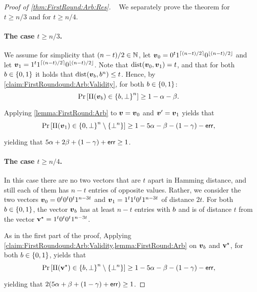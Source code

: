 \begin{proof}[Proof of \cref{thm:FirstRound:Arb:Res}]~
We separately prove the theorem for $t \ge n/3$ and for $t \ge n/4$.

\paragraph{The case $t \ge n/3$.}
We assume for simplicity that $(n-t)/2\in {\mathbb{N}}$, let ${ \boldsymbol{v}}_0= 0^t 1^{\left\lceil (n-t)/2 \right\rceil} 0^{\left \lfloor(n-t)/2 \right \rfloor} $ and let ${ \boldsymbol{v}}_1 = 1^t 1^{\left\lceil (n-t)/2 \right\rceil} 0^{\left \lfloor(n-t)/2 \right \rfloor}$. Note that $\mathrm{dist}({ \boldsymbol{v}}_0,{ \boldsymbol{v}}_1) = t$, and that for both $b\in \{0,1\}$ it holds that $\mathrm{dist}({ \boldsymbol{v}}_b,b^n)\le t$. Hence, by \cref{claim:FirstRoundound:Arb:Validity}, for both $b\in \{0,1\}$:
\begin{align*}
\Pr_{}\left[\Pi({ \boldsymbol{v}}_b) \in \left\{b,\bot\right\}^n\right] \ge 1 - \alpha - \beta.
\end{align*}
Applying \cref{lemma:FirstRound:Arb} to ${ \boldsymbol{v}}= { \boldsymbol{v}}_0$ and ${ \boldsymbol{v}}'= { \boldsymbol{v}}_1$ yields that
\begin{align*}
\Pr_{}\left[\Pi({ \boldsymbol{v}}_1) \in \left\{0,\perp\right\}^n \setminus \left\{\bot^n\right\}\right] \ge 1 - 5\alpha - \beta - (1- \gamma) - \mathsf{err},
\end{align*}
yielding that $5\alpha + 2\beta + (1-\gamma) + \mathsf{err}\ge 1$.

\paragraph{The case $t \ge n/4$.} In this case there are no two vectors that are $t$ apart in Hamming distance, and still each of them has $n-t$ entries of opposite values. Rather, we consider the two vectors ${ \boldsymbol{v}}_0= 0^t 0^t 0^t 1^{n-3t}$ and ${ \boldsymbol{v}}_1= 1^t 1^t 0^t 1^{n-3t}$ of distance $2t$. For both $b\in \{0,1\}$, the vector ${ \boldsymbol{v}}_b$ has at least $n-t$ entries with $b$ and is of distance $t$ from the vector $\mathbf{v}^{\star} =1^t 0^t 0^t 1^{n-3t}$.

As in the first part of the proof, Applying \cref{claim:FirstRoundound:Arb:Validity,lemma:FirstRound:Arb} on ${ \boldsymbol{v}}_b$ and $\mathbf{v}^{\star}$, for both $b\in \{0,1\}$, yields that
\begin{align*}
\Pr_{}\left[\Pi(\mathbf{v}^{\star}) \in \left\{b,\bot\right\}^n \setminus \left\{\bot^n\right\}\right] \ge 1 - 5\alpha - \beta - (1- \gamma) - \mathsf{err},
\end{align*}
yielding that $2(5\alpha + \beta + (1- \gamma) + \mathsf{err}) \ge 1$.
\end{proof}
	
	
\newcommand{\PPf}{\Pi^\cP}	
